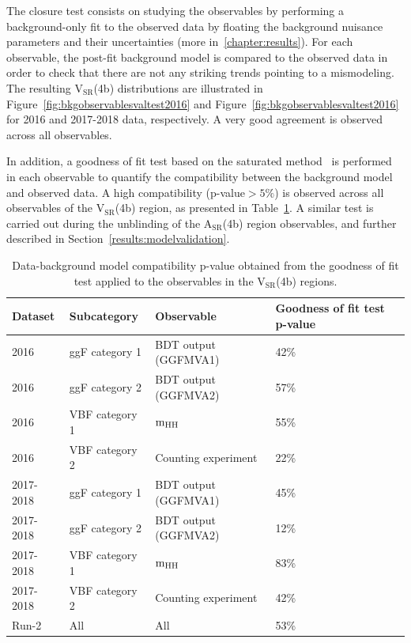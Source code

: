 The closure test consists on studying the observables by performing a background-only fit to the observed data by floating the background nuisance parameters and their uncertainties (more in~\ref{chapter:results}). For each observable, the post-fit background model is compared to the observed data in order to check that there are not any striking trends pointing to a mismodeling. The resulting $\mathrm{V_{SR}}$(4b) distributions are illustrated in Figure~\ref{fig:bkgobservablesvaltest2016} and Figure~\ref{fig:bkgobservablesvaltest2016} for 2016 and 2017-2018 data, respectively. A very good agreement is observed across all observables.

In addition, a goodness of fit test based on the saturated method~\cite{statsaturatedmodel} is performed in each observable to quantify the compatibility between the background model and observed data. A high compatibility (p-value$>5\%$) is observed across all observables of the $\mathrm{V_{SR}}$(4b) region, as presented in Table~\ref{tab:valcompatibilty}. A similar test is carried out during the unblinding of the $\mathrm{A_{SR}}$(4b) region observables, and further described in Section~\ref{results:modelvalidation}.

\begin{table}[htbp!]
\caption[Data-background model compatibility p-value obtained from the goodness of fit test in the validation region]{\label{tab:valcompatibilty} Data-background model compatibility p-value obtained from the goodness of fit test applied to the observables in the $\mathrm{V_{SR}}$(4b) regions.}
\centering

\begin{tabularx}{\textwidth}{l l X X}
    \hline
    Dataset          & Subcategory    & Observable           &  Goodness of fit test p-value \\    
    \hline
    2016      & ggF category 1 & BDT output (GGFMVA1) & 42\% \\
    2016      & ggF category 2 & BDT output (GGFMVA2) & 57\% \\
    2016      & VBF category 1 & $\mathrm{m_{HH}}$               & 55\% \\
    2016      & VBF category 2 & Counting experiment  & 22\% \\
    2017-2018 & ggF category 1 & BDT output (GGFMVA1) & 45\% \\
    2017-2018 & ggF category 2 & BDT output (GGFMVA2) & 12\% \\
    2017-2018 & VBF category 1 & $\mathrm{m_{HH}}$               & 83\% \\
    2017-2018 & VBF category 2 & Counting experiment  & 42\% \\
    Run-2     & All            & All                  & 53\% \\ 
    \hline
\end{tabularx}
\end{table}

